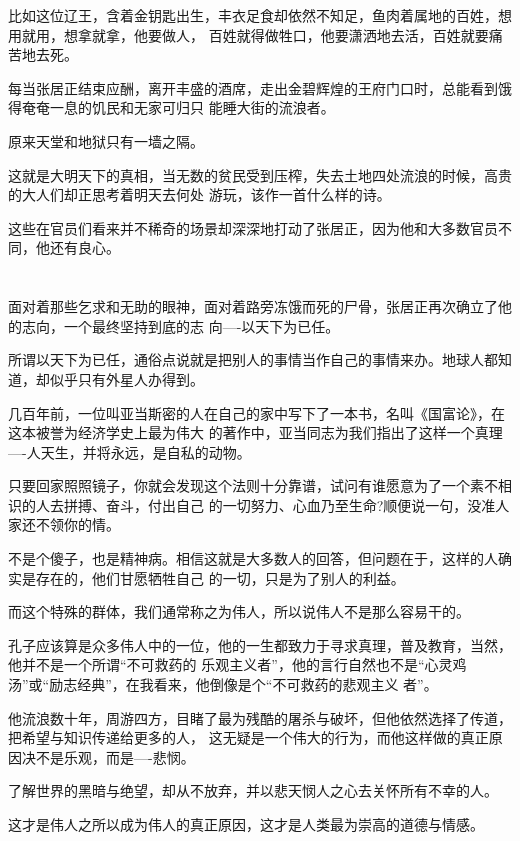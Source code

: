 \documentclass[11pt,a4paper,onecolumn]{article}
\begin{document}
比如这位辽王，含着金钥匙出生，丰衣足食却依然不知足，鱼肉着属地的百姓，想用就用，想拿就拿，他要做人，
百姓就得做牲口，他要潇洒地去活，百姓就要痛苦地去死。

每当张居正结束应酬，离开丰盛的酒席，走出金碧辉煌的王府门口时，总能看到饿得奄奄一息的饥民和无家可归只
能睡大街的流浪者。

原来天堂和地狱只有一墙之隔。

这就是大明天下的真相，当无数的贫民受到压榨，失去土地四处流浪的时候，高贵的大人们却正思考着明天去何处
游玩，该作一首什么样的诗。

这些在官员们看来并不稀奇的场景却深深地打动了张居正，因为他和大多数官员不同，他还有良心。

\section[\thesection]{}

面对着那些乞求和无助的眼神，面对着路旁冻饿而死的尸骨，张居正再次确立了他的志向，一个最终坚持到底的志
向----以天下为已任。

所谓以天下为已任，通俗点说就是把别人的事情当作自己的事情来办。地球人都知道，却似乎只有外星人办得到。

几百年前，一位叫亚当斯密的人在自己的家中写下了一本书，名叫《国富论》，在这本被誉为经济学史上最为伟大
的著作中，亚当同志为我们指出了这样一个真理----人天生，并将永远，是自私的动物。

只要回家照照镜子，你就会发现这个法则十分靠谱，试问有谁愿意为了一个素不相识的人去拼搏、奋斗，付出自己
的一切努力、心血乃至生命?顺便说一句，没准人家还不领你的情。

不是个傻子，也是精神病。相信这就是大多数人的回答，但问题在于，这样的人确实是存在的，他们甘愿牺牲自己
的一切，只是为了别人的利益。

而这个特殊的群体，我们通常称之为伟人，所以说伟人不是那么容易干的。

孔子应该算是众多伟人中的一位，他的一生都致力于寻求真理，普及教育，当然，他并不是一个所谓``不可救药的
乐观主义者''，他的言行自然也不是``心灵鸡汤''或``励志经典''，在我看来，他倒像是个``不可救药的悲观主义
者''。

他流浪数十年，周游四方，目睹了最为残酷的屠杀与破坏，但他依然选择了传道，把希望与知识传递给更多的人，
这无疑是一个伟大的行为，而他这样做的真正原因决不是乐观，而是----悲悯。

了解世界的黑暗与绝望，却从不放弃，并以悲天悯人之心去关怀所有不幸的人。

这才是伟人之所以成为伟人的真正原因，这才是人类最为崇高的道德与情感。
\end{document}
